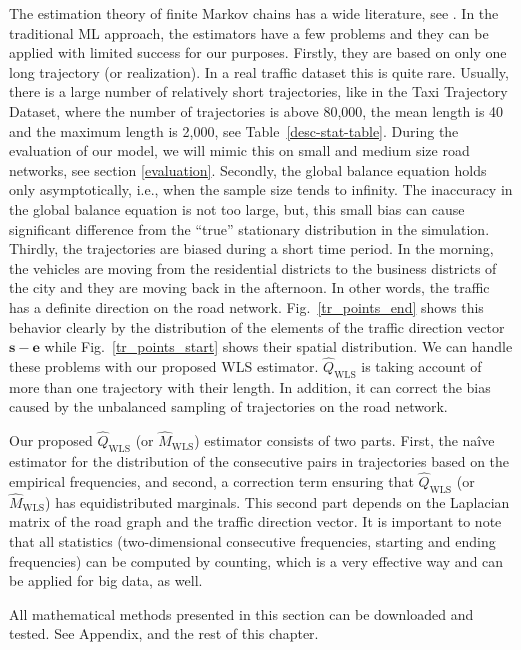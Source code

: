 \documentclass[b5paper,12pt]{report}
\theoremstyle{definition}
\newcommand{\be}{\boldsymbol{e}}
\newcommand{\bs}{\boldsymbol{s}}
\begin{document}
The estimation theory of finite Markov chains has a wide literature, see \cite{billingsley1961}. In the traditional ML approach, the estimators have a few problems and they can be applied with limited success for our purposes. Firstly, they are based on only one long trajectory (or realization). In a real traffic dataset this is quite rare. Usually, there is a large number of relatively short trajectories, like in the Taxi Trajectory Dataset, where the number of trajectories is above 80,000, the mean length is 40 and the maximum length is 2,000, see Table~\ref{desc-stat-table}. During the evaluation of our model, we will mimic this on small and medium size road networks, see section \ref{evaluation}. Secondly, the global balance equation holds only asymptotically, i.e., when the sample size tends to infinity. The inaccuracy in the global balance equation is not too large, but, this small bias can cause significant difference from the \enquote{true} stationary distribution in the simulation. Thirdly, the trajectories are biased during a short time period. In the morning, the vehicles are moving from the residential districts to the business districts of the city and they are moving back in the afternoon. In other words, the traffic has a definite direction on the road network. Fig.~\ref{tr_points_end} shows this behavior clearly by the distribution of the elements of the traffic direction vector $\bs-\be$ while Fig.~\ref{tr_points_start} shows their spatial distribution. We can handle these problems with our proposed WLS estimator. $\widehat{Q}_{\textrm{WLS}}$ is taking account of more than one trajectory with their length. In addition, it can correct the bias caused by the unbalanced sampling of trajectories on the road network.

Our proposed $\widehat{Q}_{\textrm{WLS}}$ (or $\widehat{M}_{\textrm{WLS}}$) estimator consists of two parts. First, the na\^ ive estimator for the distribution of the consecutive pairs in trajectories based on the empirical frequencies, and second, a correction term ensuring that $\widehat{Q}_{\textrm{WLS}}$ (or $\widehat{M}_{\textrm{WLS}}$) has equidistributed marginals. This second part depends on the Laplacian matrix of the road graph and the traffic direction vector. It is important to note that all statistics (two-dimensional consecutive frequencies, starting and ending frequencies) can be computed by counting, which is a very effective way and can be applied for big data, as well.

All mathematical methods presented in this section can be downloaded and tested. See Appendix, \cite[/model-sources/Markovkernel]{csts-repo} and the rest of this chapter.
\end{document}

